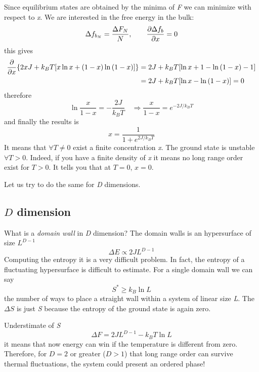 \documentclass[../main/main.tex]{subfiles}
\begin{document}
Since equilibrium states are obtained by the minima of \emph{F} we can minimize with respect to \emph{x}. We are interested in the free energy in the bulk:
\begin{equation}
  \Delta f_{b_N} = \frac{\Delta F_N}{N}, \qquad \pdv{\Delta f_b}{x} = 0
\end{equation}
this gives
\begin{equation}
\begin{split}
  \pdv{}{x} \qty{ 2xJ +k_B T \qty[x \ln{x} + (1-x)\ln{(1-x)}  ] } &=  2J + k_B T \qty[\ln{x} +1 -\ln{(1-x)} -1 ]\\
  & = 2J + k_B T \qty[\ln{x}- \ln{(1-x)}  ] = 0
\end{split}
\end{equation}
therefore
\begin{equation}
  \ln{\frac{x}{1-x}} = -\frac{2J}{k_B T} \quad \Rightarrow \frac{x}{1-x} = e^{-2J/k_BT}
\end{equation}
and finally the results is
\begin{equation}
 x = \frac{1}{1+e^{2J/k_BT} }
\end{equation}
It means that  \( \forall T \neq 0 \) exist a finite concentration \emph{x}. The ground state is unstable \( \forall T>0 \). Indeed, if you have a finite density of \emph{x} it means no long range order exist for \( T>0 \).  It tells you that at \( T=0 \), \( x=0 \).

Let us try to do the same for \emph{D} dimensions.

\subsection{\( D \) dimension}
What is a \emph{domain wall} in \emph{D} dimension? The domain walls is an hypersurface of size \( L^{D-1} \)
\begin{equation}
  \Delta E \propto 2JL^{D-1}
\end{equation}
Computing the entropy it is a very difficult problem. In fact, the entropy of a fluctuating hypersurface is difficult to estimate. For a single domain wall we can say
\begin{equation}
  S^* \ge k_B \ln{L}
\end{equation}
the number of ways to place a straight wall within a system of linear size \emph{L}.
The \( \Delta S \)  is just \emph{S}  because the entropy of the ground state is again zero.
\begin{remark}
Understimate of \emph{S}
\begin{equation}
  \Delta F = 2JL^{D-1}-k_B T \ln{L}
\end{equation}
it means that now energy can win if the temperature is different from zero. Therefore, for \( D=2 \)  or greater (\( D>1 \)) that long range order can survive  thermal fluctuations, the system could present an ordered phase!
\end{remark}
\end{document}
